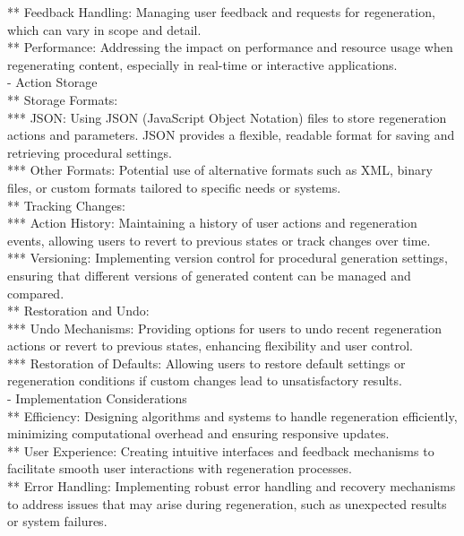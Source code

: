 ** Feedback Handling: Managing user feedback and requests for regeneration, which can vary in scope and detail. \\
** Performance: Addressing the impact on performance and resource usage when regenerating content, especially in real-time or interactive applications. \\
- Action Storage \\
** Storage Formats: \\
*** JSON: Using JSON (JavaScript Object Notation) files to store regeneration actions and parameters. JSON provides a flexible, readable format for saving and retrieving procedural settings. \\
*** Other Formats: Potential use of alternative formats such as XML, binary files, or custom formats tailored to specific needs or systems. \\
** Tracking Changes: \\
*** Action History: Maintaining a history of user actions and regeneration events, allowing users to revert to previous states or track changes over time. \\
*** Versioning: Implementing version control for procedural generation settings, ensuring that different versions of generated content can be managed and compared. \\
** Restoration and Undo: \\
*** Undo Mechanisms: Providing options for users to undo recent regeneration actions or revert to previous states, enhancing flexibility and user control. \\
*** Restoration of Defaults: Allowing users to restore default settings or regeneration conditions if custom changes lead to unsatisfactory results. \\
- Implementation Considerations \\
** Efficiency: Designing algorithms and systems to handle regeneration efficiently, minimizing computational overhead and ensuring responsive updates. \\
** User Experience: Creating intuitive interfaces and feedback mechanisms to facilitate smooth user interactions with regeneration processes. \\
** Error Handling: Implementing robust error handling and recovery mechanisms to address issues that may arise during regeneration, such as unexpected results or system failures.


